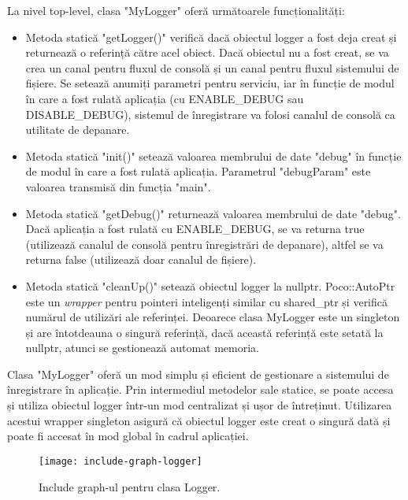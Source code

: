 La nivel top-level, clasa "MyLogger" oferă următoarele funcționalități:

\begin{itemize}
    \item Metoda statică "getLogger()" verifică dacă obiectul logger a fost deja creat și returnează o referință către acel obiect. Dacă obiectul nu a fost creat, se va crea un canal pentru fluxul de consolă și un canal pentru fluxul sistemului de fișiere. Se setează anumiți parametri pentru serviciu, iar în funcție de modul în care a fost rulată aplicația (cu ENABLE\_DEBUG sau DISABLE\_DEBUG), sistemul de înregistrare va folosi canalul de consolă ca utilitate de depanare.

    \item Metoda statică "init()" setează valoarea membrului de date "debug" în funcție de modul în care a fost rulată aplicația. Parametrul "debugParam" este valoarea transmisă din funcția "main".

    \item Metoda statică "getDebug()" returnează valoarea membrului de date "debug". Dacă aplicația a fost rulată cu ENABLE\_DEBUG, se va returna true (utilizează canalul de consolă pentru înregistrări de depanare), altfel se va returna false (utilizează doar canalul de fișiere).

    \item Metoda statică "cleanUp()" setează obiectul logger la nullptr. Poco::AutoPtr este un \emph{wrapper} pentru pointeri inteligenți similar cu shared\_ptr și verifică numărul de utilizări ale referinței. Deoarece clasa MyLogger este un singleton și are întotdeauna o singură referință, dacă această referință este setată la nullptr, atunci se gestionează automat memoria.
\end{itemize}

Clasa "MyLogger" oferă un mod simplu și eficient de gestionare a sistemului de înregistrare în aplicație. Prin intermediul metodelor sale statice, se poate accesa și utiliza obiectul logger într-un mod centralizat și ușor de întreținut. Utilizarea acestui wrapper singleton asigură că obiectul logger este creat o singură dată și poate fi accesat în mod global în cadrul aplicației.

\begin{figure}[h]
  \centering
  \texttt{[image: include-graph-logger]}
  \caption{Include graph-ul pentru clasa Logger.}
  \label{fig:includeGraphLogger}
\end{figure}

